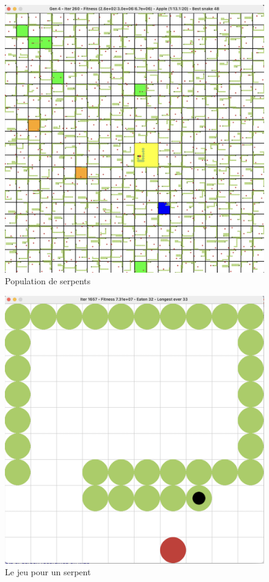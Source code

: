 \documentclass[10pt]{beamer}
\begin{document}
\begin{frame}
\begin{columns}[T]
\begin{column}{0.26\textwidth}
\begin{figure}
\includegraphics[width=1\textwidth]{snake_population.png}
\vspace{-0.7cm}
\caption*{\tiny Population de serpents}
\end{figure}

\begin{figure}
\centering
\vspace{-0.6cm}
\includegraphics[width=1\textwidth]{snake_game.png}
\vspace{-0.7cm}
\caption*{\tiny Le jeu pour un serpent}
\end{figure}


\end{column}
\end{columns}
\end{frame}
\end{document}
